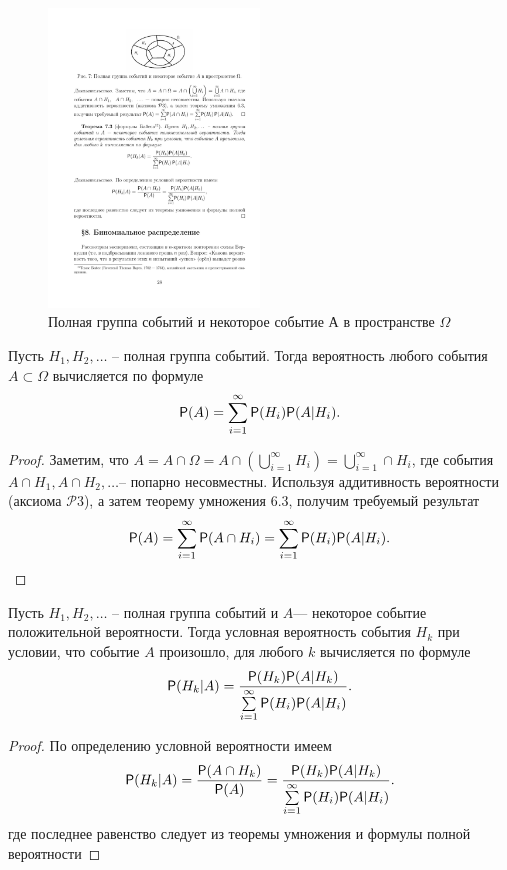 \begin{figure}[H]
	\centering
	\includegraphics[width=0.5\textwidth]{pic/pic7.pdf}
	\caption{Полная группа событий и некоторое событие А в пространстве $\Omega$}
	\label{pic:7}
\end{figure}

\begin{theorem}
\label{th:7.2}
Пусть $H_1,H_2,\dots$ – полная группа
событий. Тогда  вероятность любого события $A\subset \Omega$ вычисляется по формуле
\begin{equation*}
	\P(A)=\sum\limits_{i=1}^{\infty}\P(H_i)\P(A|H_i).
\end{equation*}
\end{theorem}
\begin{proof}
	Заметим, что $A=A\cap\Omega=A\cap\left(\bigcup\limits^{\infty}_{i=1}H_i\right)=\bigcup\limits_{i=1}^{\infty}\cap H_i$, где события $A\cap H_1,A\cap H_2,\dots$-- попарно несовместны. Используя аддитивность вероятности (аксиома $\mathcal{P}3$), а затем теорему умножения 6.3, получим требуемый результат
	\begin{equation*}
		\P(A)=\sum\limits_{i=1}^{\infty}\P(A\cap H_i)=
		\sum\limits_{i=1}^{\infty}\P(H_i)\P(A|H_i).
	\end{equation*}
\end{proof}

\begin{theorem}
\label{th:7.3}
Пусть $H_1,H_2,\dots$ – полная группа
событий и $A $— некоторое событие положительной вероятности. Тогда
условная вероятность события $H_k$ при условии, что событие $A$ произошло,
для любого $k$ вычисляется по формуле
\begin{equation*}
	\P(H_k|A)=\frac{\P(H_k)\P(A|H_k)}{\sum\limits_{i=1}^{\infty}\P(H_i)\P(A|H_i)}.
\end{equation*}
\end{theorem}

\begin{proof}
	По определению условной вероятности имеем
	\begin{equation*}
		\P(H_k|A)=\frac{\P(A\cap H_k)}{\P(A)}=\frac{\P(H_k)\P(A|H_k)}
		{\sum\limits_{i=1}^{\infty}\P(H_i)\P(A|H_i)}.
	\end{equation*}
где последнее равенство следует из теоремы умножения и формулы полной
вероятности
\end{proof}